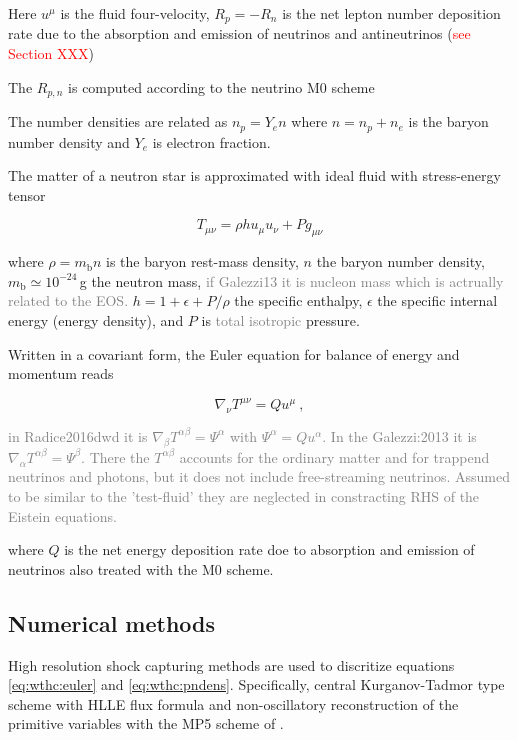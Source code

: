 \documentclass[11pt,a4paper,headinclude=true,DIV=14,BCOR=8mm,chapterprefix,listof=totoc,twoside,openright,abstracton]{scrbook}
\newcommand{\red}[1]{\textcolor{red}{#1}}
\newcommand{\gray}[1]{\textcolor{gray}{#1}}
\begin{document}
Here $u^{\mu}$ is the fluid four-velocity, $R_p = -R_n$ is the net
lepton number deposition rate due to the absorption and emission of neutrinos 
and antineutrinos (\red{see Section XXX})

The $R_{p,n}$ is computed according to the neutrino M0 scheme \cite{Radice:2016dwd,Radice:2018pdn}

The number densities are related as $n_p=Y_e n$ where $n = n_p + n_e$ is the baryon 
number density and $Y_e$ is electron fraction.

The matter of a neutron star is approximated with ideal fluid with stress-energy tensor

\begin{equation}
T_{\mu\nu} = \rho h u_{\mu} u_{\nu} + Pg_{\mu\nu}
\end{equation}

where $\rho=m_{\text{b}} n$ is the baryon rest-mass density, 
$n$ the baryon number density, $m_{\text{b}} \simeq 10^{-24}\,$g 
the neutron mass, 
\gray{if Galezzi13 it is nucleon mass which is actrually related to the EOS.}
$h=1+\epsilon + P/\rho$ the specific enthalpy, 
$\epsilon$ the specific internal energy (energy density),
and $P$ is \gray{total isotropic} pressure.

Written in a covariant form, the Euler equation for balance of energy and momentum reads

\begin{equation}
\label{eq:wthc:euler}
\nabla_\nu T^{\mu\nu} = Q u^{\mu} \ ,
\end{equation}

\gray{in Radice2016dwd it is $\nabla_{\beta}T^{\alpha\beta}=\Psi^{\alpha}$
with $\Psi^{\alpha} = Q u^{\alpha}$.
}
\gray{In the Galezzi:2013 it is $\nabla_{\alpha}T^{\alpha\beta}=\Psi^{\beta}$.
There the $T^{\alpha\beta}$ accounts for the ordinary matter and for trappend neutrinos and photons, but it does not include free-streaming neutrinos. Assumed to be similar to the 'test-fluid' they are neglected in constracting RHS of the Eistein equations.
}

where $Q$ is the net energy deposition rate doe to absorption
and emission of neutrinos also treated with the M0 scheme.
 

\subsection{Numerical methods}


High resolution shock capturing methods are used to discritize equations 
\eqref{eq:wthc:euler} and \eqref{eq:wthc:pndens}.
Specifically, central Kurganov-Tadmor type scheme \cite{Kurganov:2000} with 
HLLE flux formula \cite{Einfeldt:1988}
and non-oscillatory reconstruction of the primitive variables with the MP5 scheme of
\cite{Suresh:1997}.
\end{document}
